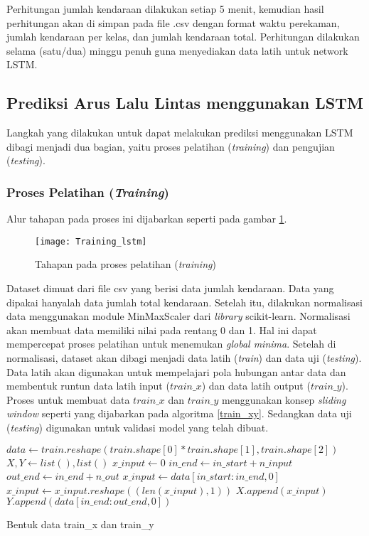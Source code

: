\documentclass[../thesis.tex]{subfiles}
\begin{document}
Perhitungan jumlah kendaraan dilakukan setiap 5 menit, kemudian hasil perhitungan akan di simpan pada file .csv dengan format waktu perekaman, jumlah kendaraan per kelas, dan jumlah kendaraan total. Perhitungan dilakukan selama (satu/dua) minggu penuh guna menyediakan data latih untuk network LSTM.  

\subsection{Prediksi Arus Lalu Lintas menggunakan LSTM}
Langkah yang dilakukan untuk dapat melakukan prediksi menggunakan LSTM dibagi menjadi dua bagian, yaitu proses pelatihan (\textit{training}) dan pengujian (\textit{testing}).

\subsubsection{Proses Pelatihan (\textit{Training})}
Alur tahapan pada proses ini dijabarkan seperti pada gambar \ref{lstm_training}.
\begin{figure}
	\centering
	\texttt{[image: Training\_lstm]}
	\caption{Tahapan pada proses pelatihan (\textit{training})}
	\label{lstm_training}
\end{figure}
Dataset dimuat dari file csv yang berisi data jumlah kendaraan. Data yang dipakai hanyalah data jumlah total kendaraan. Setelah itu, dilakukan normalisasi data menggunakan module MinMaxScaler dari \textit{library} scikit-learn. Normalisasi akan membuat data memiliki nilai pada rentang 0 dan 1. Hal ini dapat mempercepat proses pelatihan untuk menemukan \textit{global minima}.
Setelah di normalisasi, dataset akan dibagi menjadi data latih (\textit{train}) dan data uji (\textit{testing}). Data latih akan digunakan untuk mempelajari pola hubungan antar data dan membentuk runtun data latih input ($train\_x$) dan data latih output ($train\_y$). Proses untuk membuat data $train\_x$ dan $train\_y$ menggunakan konsep \textit{sliding window} seperti yang dijabarkan pada algoritma \ref{train_xy}. Sedangkan data uji (\textit{testing}) digunakan untuk validasi model yang telah dibuat.

\begin{algorithm}[htp]
	\begin{algorithmic}[1]
		\State $data \leftarrow train.reshape(train.shape[0]*train.shape[1], train.shape[2])$
		\State $X, Y \leftarrow list(), list()$
		\State $x\_input \leftarrow 0$
			\State $in\_end \leftarrow in\_start + n\_input$
			\State $out\_end \leftarrow in\_end + n\_out$
				\State $x\_input \leftarrow data[in\_start: in\_end, 0]$
				\State $x\_input \leftarrow x\_input.reshape((len(x\_input), 1))$
				\State $X.append(x\_input)$
				\State $Y.append(data[in\_end:out\_end, 0])$
			\EndIf
		\EndFor
	\EndFunction
	\end{algorithmic}
	\caption{Bentuk data train_x dan train_y}
	\label{train_xy}
\end{algorithm}
	
\end{document}
